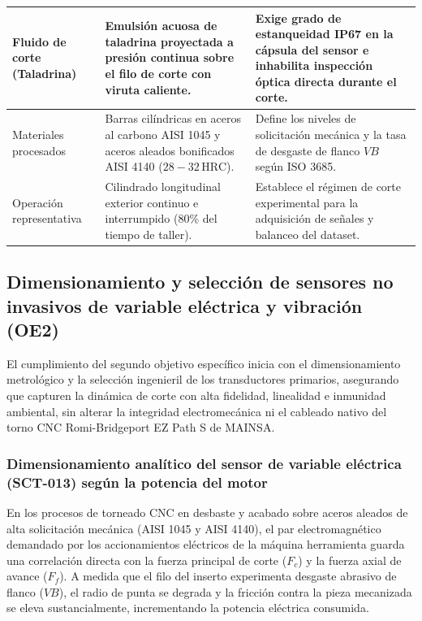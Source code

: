 {\begin{longtable}{L{3.4cm}L{5.2cm}L{5.2cm}}
Fluido de corte (Taladrina) & Emulsión acuosa de taladrina proyectada a presión continua sobre el filo de corte con viruta caliente. & Exige grado de estanqueidad IP67 en la cápsula del sensor e inhabilita inspección óptica directa durante el corte.\\ \hline

Materiales procesados & Barras cilíndricas en aceros al carbono AISI 1045 y aceros aleados bonificados AISI 4140 ($28 - 32\,\text{HRC}$). & Define los niveles de solicitación mecánica y la tasa de desgaste de flanco $VB$ según ISO 3685.\\ \hline

Operación representativa & Cilindrado longitudinal exterior continuo e interrumpido (80\% del tiempo de taller). & Establece el régimen de corte experimental para la adquisición de señales y balanceo del dataset.\\ \hline

\end{longtable}
}

\subsection{Dimensionamiento y selección de sensores no invasivos de variable eléctrica y vibración (OE2)}
\label{subsec:dimensionamiento_sensores}

El cumplimiento del segundo objetivo específico inicia con el dimensionamiento metrológico y la selección ingenieril de los transductores primarios, asegurando que capturen la dinámica de corte con alta fidelidad, linealidad e inmunidad ambiental, sin alterar la integridad electromecánica ni el cableado nativo del torno CNC Romi-Bridgeport EZ Path S de MAINSA.

\subsubsection{Dimensionamiento analítico del sensor de variable eléctrica (SCT-013) según la potencia del motor}
\label{subsubsec:dimensionamiento_sensor_corriente}

En los procesos de torneado CNC en desbaste y acabado sobre aceros aleados de alta solicitación mecánica (AISI 1045 y AISI 4140), el par electromagnético demandado por los accionamientos eléctricos de la máquina herramienta guarda una correlación directa con la fuerza principal de corte ($F_c$) y la fuerza axial de avance ($F_f$). A medida que el filo del inserto experimenta desgaste abrasivo de flanco ($VB$), el radio de punta se degrada y la fricción contra la pieza mecanizada se eleva sustancialmente, incrementando la potencia eléctrica consumida.

